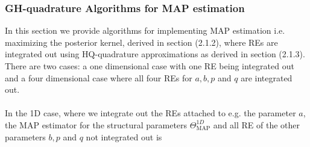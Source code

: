 \documentclass[a4paper,12pt]{scrartcl} %
\begin{document}
\subsubsection{GH-quadrature Algorithms for MAP estimation}
In this section we provide algorithms for implementing MAP estimation i.e. maximizing the posterior kernel, derived in section (2.1.2), where REs are integrated out using HQ-quadrature approximations as derived in section (2.1.3). There are two cases: a one dimensional case with one RE being integrated out and a four dimensional case where all four REs for $a,b,p$ and $q$ are integrated out.\\\\
In the 1D case, where we integrate out the REs attached to e.g. the parameter $a$, the MAP estimator for the structural parameters $\Theta_{\text{MAP}}^{1D}$ and all RE of the other parameters $b,p$ and $q$ not integrated out is 
\end{document}
